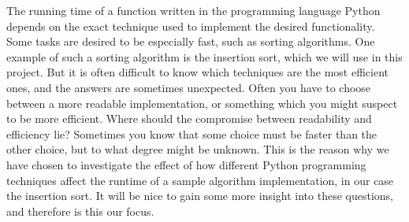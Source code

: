 The running time of a function written in the programming language Python depends on the exact technique used to implement the desired functionality. Some tasks are desired to be especially fast, such as sorting algorithms. One example of such a sorting algorithm is the insertion sort, which we will use in this project. 
But it is often difficult to know which techniques are the most efficient ones, and the answers are sometimes unexpected. Often you have to choose between a more readable implementation, or something which you might suspect to be more efficient. Where should the compromise between readability and efficiency lie? Sometimes you know that some choice must be faster than the other choice, but to what degree might be unknown. This is the reason why we have chosen to investigate the effect of how different Python programming techniques affect the runtime of a sample algorithm implementation, in our case the insertion sort.
It will be nice to gain some more insight into these questions, and therefore is this our focus.

